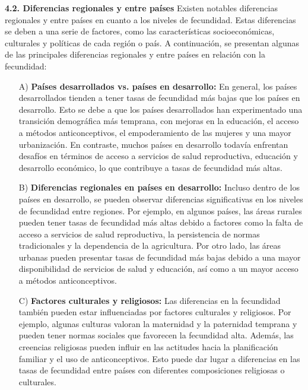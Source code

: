 \documentclass[8pt,a4paper]{beamer}
\begin{document}
{\begin{frame}{}
\begin{block}{\textbf{4.2. Diferencias regionales y entre países}}
\setlength{\parskip}{3px}
\justifying
Existen notables diferencias regionales y entre países en cuanto a los niveles de fecundidad. Estas diferencias se deben a una serie de factores, como las características socioeconómicas, culturales y políticas de cada región o país. A continuación, se presentan algunas de las principales diferencias regionales y entre países en relación con la fecundidad:
\begin{enumerate}
\setlength{\parskip}{3px}
\justifying
\item[A)] \textbf{Países desarrollados vs. países en desarrollo:} En general, los países desarrollados tienden a tener tasas de fecundidad más bajas que los países en desarrollo. Esto se debe a que los países desarrollados han experimentado una transición demográfica más temprana, con mejoras en la educación, el acceso a métodos anticonceptivos, el empoderamiento de las mujeres y una mayor urbanización. En contraste, muchos países en desarrollo todavía enfrentan desafíos en términos de acceso a servicios de salud reproductiva, educación y desarrollo económico, lo que contribuye a tasas de fecundidad más altas.

\end{enumerate}
\end{block}
\end{frame}

\begin{frame}{}
\begin{block}{}
\setlength{\parskip}{3px}
\justifying
\begin{enumerate}
\setlength{\parskip}{3px}
\justifying
\item[B)] \textbf{Diferencias regionales en países en desarrollo:} Incluso dentro de los países en desarrollo, se pueden observar diferencias significativas en los niveles de fecundidad entre regiones. Por ejemplo, en algunos países, las áreas rurales pueden tener tasas de fecundidad más altas debido a factores como la falta de acceso a servicios de salud reproductiva, la persistencia de normas tradicionales y la dependencia de la agricultura. Por otro lado, las áreas urbanas pueden presentar tasas de fecundidad más bajas debido a una mayor disponibilidad de servicios de salud y educación, así como a un mayor acceso a métodos anticonceptivos.

\item[C)] \textbf{Factores culturales y religiosos:} Las diferencias en la fecundidad también pueden estar influenciadas por factores culturales y religiosos. Por ejemplo, algunas culturas valoran la maternidad y la paternidad temprana y pueden tener normas sociales que favorecen la fecundidad alta. Además, las creencias religiosas pueden influir en las actitudes hacia la planificación familiar y el uso de anticonceptivos. Esto puede dar lugar a diferencias en las tasas de fecundidad entre países con diferentes composiciones religiosas o culturales.
\end{enumerate}
\end{block}
\end{frame}


}
\end{document}
